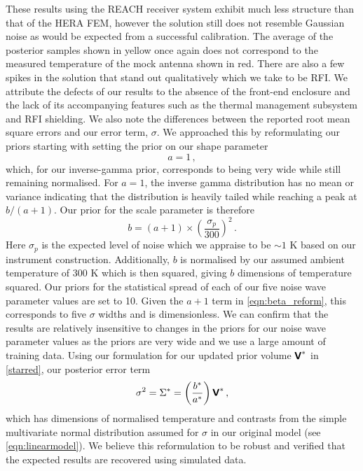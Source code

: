 These results using the REACH receiver system exhibit much less structure than that of the HERA FEM, however the solution still does not resemble Gaussian noise as would be expected from a successful calibration. The average of the posterior samples shown in yellow once again does not correspond to the measured temperature of the mock antenna shown in red. There are also a few spikes in the solution that stand out qualitatively which we take to be RFI. We attribute the defects of our results to the absence of the front-end enclosure and the lack of its accompanying features such as the thermal management subsystem and RFI shielding. We also note the differences between the reported root mean square errors and our error term, $\sigma$. We approached this by reformulating our priors starting with setting the prior on our shape parameter
\begin{equation}
    a = 1 \,,
    \label{eqn:alpha_reform}
\end{equation}
which, for our inverse-gamma prior, corresponds to being very wide while still remaining normalised. For $a=1$, the inverse gamma distribution has no mean or variance \citep{inverse_gamma} indicating that the distribution is heavily tailed while reaching a peak at $b/(a + 1)$. Our prior for the scale parameter is therefore 
\begin{equation}
    b = \left(a + 1\right) \times \left(\frac{\sigma_{p}}{300}\right)^2 \,.
    \label{eqn:beta_reform}
\end{equation}
Here $\sigma_{p}$ is the expected level of noise which we appraise to be $\sim 1$ K based on our instrument construction. Additionally, $b$ is normalised by our assumed ambient temperature of 300 K which is then squared, giving $b$ dimensions of temperature squared. Our priors for the statistical spread of each of our five noise wave parameter values are set to 10. Given the $a + 1$ term in \cref{eqn:beta_reform}, this corresponds to five $\sigma$ widths and is dimensionless. We can confirm that the results are relatively insensitive to changes in the priors for our noise wave parameter values as the priors are very wide and we use a large amount of training data. Using our formulation for our updated prior volume $\textbf{\textsf{V}}^*$ in \cref{starred}, our posterior error term
\begin{equation}
    \sigma^2 = \Sigma^* = \left( \frac{b^*}{a^*} \right) \textbf{\textsf{V}}^* \,,
    \label{eqn:sigma_reform}
\end{equation}
which has dimensions of normalised temperature and contrasts from the simple multivariate normal distribution assumed for $\sigma$ in our original model (see \cref{eqn:linearmodel}). We believe this reformulation to be robust and verified that the expected results are recovered using simulated data.

